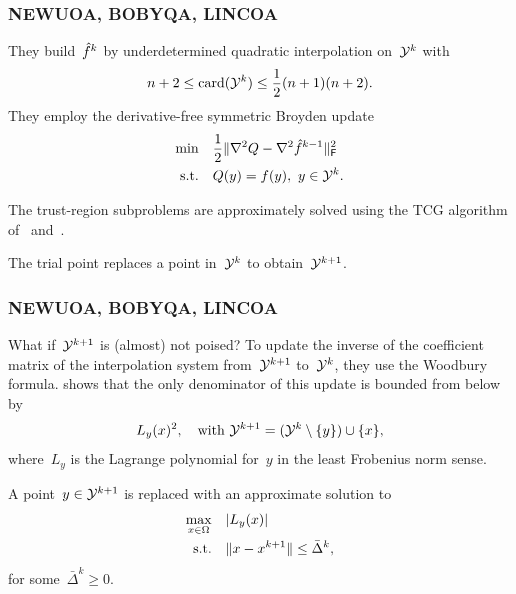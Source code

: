 \documentclass{polyu-presentation}
\newcommand{\objm}[1][]{\hat{f}\ifthenelse{\equal{#1}{}}{}{^{#1}}}
\newcommand{\xpt}[1][]{\mathcal{Y}\ifthenelse{\equal{#1}{}}{}{^{#1}}}
\begin{document}
\begin{frame}
    \frametitle{NEWUOA, BOBYQA, LINCOA~\parencite{Powell_2006,Powell_2009,Powell_2015}}

	They build~$\objm[k]$ by \alert{underdetermined quadratic interpolation} on~$\xpt[k]$ with
    \begin{equation*}
        n + 2 \le \card(\xpt[k]) \le \frac{1}{2} (n + 1) (n + 2).
    \end{equation*}
    They employ the \alert{derivative-free symmetric Broyden update}
    \begin{align*}
        \min        & \quad \frac{1}{2} \norm{\nabla^2 Q - \nabla^2 \objm[k - 1]}_{\mathsf{F}}^2\\
        \text{s.t.} & \quad Q(y) = f(y), ~ y \in \xpt[k].
    \end{align*}

    \begin{block}{}
        The \alert{trust-region subproblems} are approximately solved using the TCG algorithm of~\cite{Steihaug_1983} and~\cite{Toint_1981}.
    \end{block}

    \medskip

    The trial point \alert{replaces} a point in~$\xpt[k]$ to obtain~$\xpt[k + 1]$.
\end{frame}

\begin{frame}
    \frametitle{NEWUOA, BOBYQA, LINCOA~\parencite{Powell_2006,Powell_2009,Powell_2015}}

    \begin{block}{What if~$\xpt[k + 1]$ is (almost) not poised?}
        To update the \alert{inverse} of the coefficient matrix of the interpolation system from~$\xpt[k + 1]$ to~$\xpt[k]$, they use the \alert{Woodbury formula}.
        \cite{Powell_2004c} shows that the only denominator of this update is bounded from below by
        \begin{equation*}
            L_y(x)^2, \quad \text{with~$\xpt[k + 1] = (\xpt[k] \setminus \set{y}) \cup \set{x}$},
        \end{equation*}
        where~$L_y$ is the \alert{Lagrange polynomial} for~$y$ in the least Frobenius norm sense.
    \end{block}

    \smallskip

    A point~$y \in \xpt[k + 1]$ is \alert{replaced} with an approximate solution to
    \begin{align*}
        \max_{x \in \Omega} & \quad \lvert L_y(x)\rvert\\
        \text{s.t.}         & \quad \lVert x - x^{k + 1}\rVert \le \bar{\Delta}^k,
    \end{align*}
    for some~$\bar{\Delta}^k \ge 0$.
\end{frame}
\end{document}
